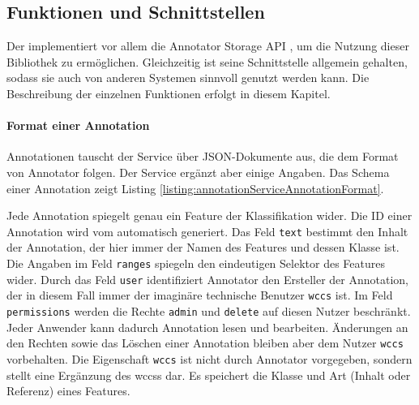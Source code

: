 \subsection{Funktionen und Schnittstellen}
    \label{section:solutionDetailsAnnotationServiceFunctions}
    Der {\annotationService} implementiert vor allem die
    Annotator Storage API \cite[Kapitel "`Storage"']{annotator:documentation},
    um die Nutzung dieser Bibliothek zu ermöglichen.
    Gleichzeitig ist seine Schnittstelle allgemein gehalten,
    sodass sie auch von anderen Systemen sinnvoll genutzt werden kann.
    Die Beschreibung der einzelnen Funktionen erfolgt in diesem Kapitel.

    \paragraph*{Format einer Annotation}
    Annotationen tauscht der Service über JSON-Dokumente aus,
    die dem Format von Annotator \cite[Kapitel "`Annotation format"']{annotator:documentation} folgen.
    Der Service ergänzt aber einige Angaben.
    Das Schema einer Annotation zeigt Listing \ref{listing:annotationServiceAnnotationFormat}.

    

    Jede Annotation spiegelt genau ein Feature der Klassifikation wider.
    Die ID einer Annotation wird vom {\annotationService} automatisch
    generiert.
    Das Feld \texttt{text} bestimmt den Inhalt der Annotation,
    der hier immer der Namen des Features und dessen Klasse ist.
    Die Angaben im Feld \texttt{ranges} spiegeln den eindeutigen Selektor des Features wider.
    Durch das Feld \texttt{user} identifiziert Annotator den Ersteller der Annotation,
    der in diesem Fall immer der imaginäre technische Benutzer \texttt{wccs} ist.
    Im Feld \texttt{permissions} werden die Rechte \texttt{admin} und \texttt{delete} auf diesen Nutzer beschränkt.
    Jeder Anwender kann dadurch Annotation lesen und bearbeiten.
    Änderungen an den Rechten sowie das Löschen einer Annotation bleiben aber dem Nutzer \texttt{wccs} vorbehalten.
    Die Eigenschaft \texttt{wccs} ist nicht durch Annotator vorgegeben,
    sondern stellt eine Ergänzung des \glspl{wccs} dar.
    Es speichert die Klasse und Art (Inhalt oder Referenz) eines Features.

